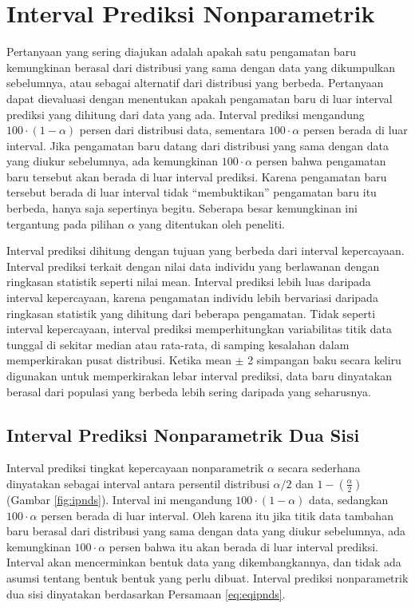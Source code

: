 \documentclass[]{book}
\begin{document}
\section{Interval Prediksi
Nonparametrik}\label{interval-prediksi-nonparametrik}

Pertanyaan yang sering diajukan adalah apakah satu pengamatan baru
kemungkinan berasal dari distribusi yang sama dengan data yang
dikumpulkan sebelumnya, atau sebagai alternatif dari distribusi yang
berbeda. Pertanyaan dapat dievaluasi dengan menentukan apakah pengamatan
baru di luar interval prediksi yang dihitung dari data yang ada.
Interval prediksi mengandung \(100\cdot\left(1-\alpha\right)\) persen
dari distribusi data, sementara \(100\cdot\alpha\) persen berada di luar
interval. Jika pengamatan baru datang dari distribusi yang sama dengan
data yang diukur sebelumnya, ada kemungkinan \(100\cdot\alpha\) persen
bahwa pengamatan baru tersebut akan berada di luar interval prediksi.
Karena pengamatan baru tersebut berada di luar interval tidak
``membuktikan'' pengamatan baru itu berbeda, hanya saja sepertinya
begitu. Seberapa besar kemungkinan ini tergantung pada pilihan
\(\alpha\) yang ditentukan oleh peneliti.

Interval prediksi dihitung dengan tujuan yang berbeda dari interval
kepercayaan. Interval prediksi terkait dengan nilai data individu yang
berlawanan dengan ringkasan statistik seperti nilai mean. Interval
prediksi lebih luas daripada interval kepercayaan, karena pengamatan
individu lebih bervariasi daripada ringkasan statistik yang dihitung
dari beberapa pengamatan. Tidak seperti interval kepercayaan, interval
prediksi memperhitungkan variabilitas titik data tunggal di sekitar
median atau rata-rata, di samping kesalahan dalam memperkirakan pusat
distribusi. Ketika mean \(\pm\) 2 simpangan baku secara keliru digunakan
untuk memperkirakan lebar interval prediksi, data baru dinyatakan
berasal dari populasi yang berbeda lebih sering daripada yang
seharusnya.

\subsection{Interval Prediksi Nonparametrik Dua
Sisi}\label{interval-prediksi-nonparametrik-dua-sisi}

Interval prediksi tingkat kepercayaan nonparametrik \(\alpha\) secara
sederhana dinyatakan sebagai interval antara persentil distribusi
\(\alpha/2\) dan \(1-\left(\frac{\alpha}{2}\right)\) (Gambar
\ref{fig:ipnds}). Interval ini mengandung
\(100\cdot\left(1-\alpha\right)\) data, sedangkan \(100\cdot\alpha\)
persen berada di luar interval. Oleh karena itu jika titik data tambahan
baru berasal dari distribusi yang sama dengan data yang diukur
sebelumnya, ada kemungkinan \(100\cdot\alpha\) persen bahwa itu akan
berada di luar interval prediksi. Interval akan mencerminkan bentuk data
yang dikembangkannya, dan tidak ada asumsi tentang bentuk bentuk yang
perlu dibuat. Interval prediksi nonparametrik dua sisi dinyatakan
berdasarkan Persamaan \eqref{eq:eqipnds}.
\end{document}
